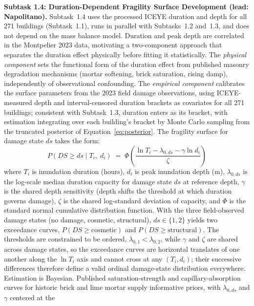\documentclass[11pt]{article}
\begin{document}
\textbf{Subtask 1.4: Duration-Dependent Fragility Surface Development
(lead: Napolitano).}
Subtask~1.4 uses the processed ICEYE duration and depth for all 271 buildings (Subtask~1.1), runs in parallel with Subtasks~1.2 and~1.3, and does not depend on the mass balance model.
Duration and peak depth are correlated in the Montpelier 2023 data, motivating a two-component approach that separates the duration effect physically before fitting it statistically.
The \textit{physical component} sets the functional form of the duration effect from
published masonry degradation mechanisms (mortar softening, brick saturation,
rising damp), independently of observational confounding.
The \textit{empirical component} calibrates the surface parameters from the 2023
field damage observations, using ICEYE-measured depth and interval-censored
duration brackets as covariates for all 271 buildings; consistent with
Subtask~1.3, duration enters as its bracket, with estimation integrating over
each building's bracket by Monte Carlo sampling from the truncated posterior
of Equation~\eqref{eq:posterior}.
The fragility surface for damage state $ds$ takes the form:
\begin{equation}\label{eq:fragility}
  P(DS \geq ds \mid T_i,\; d_i) \;=\; \Phi\!\left(
    \frac{\ln T_i - \lambda_{0,ds} - \gamma \ln d_i}{\zeta}\right)
\end{equation}
where $T_i$ is inundation duration (hours), $d_i$ is peak inundation depth (m),
$\lambda_{0,ds}$ is the log-scale median duration capacity for damage state $ds$
at reference depth, $\gamma$ is the shared depth sensitivity (depth shifts the
threshold at which duration governs damage), $\zeta$ is the shared log-standard
deviation of capacity, and $\Phi$ is the standard normal cumulative distribution
function. With the three field-observed damage states (no damage, cosmetic,
structural), $ds \in \{1,2\}$ yields two exceedance curves,
$P(DS \geq \text{cosmetic})$ and $P(DS \geq \text{structural})$. The thresholds
are constrained to be ordered, $\lambda_{0,1} < \lambda_{0,2}$, while
$\gamma$ and $\zeta$ are shared across damage states, so the exceedance curves are
horizontal translates of one another along the $\ln T_i$ axis and cannot cross at any $(T_i, d_i)$; their
successive differences therefore define a valid ordinal damage-state distribution
everywhere.
Estimation is Bayesian. Published saturation-strength and capillary-absorption
curves for historic brick and lime mortar
\cite{hall2009water,franzoni2015compressive,sathiparan2018effect} supply
informative priors, with $\lambda_{0,ds}$ and $\gamma$ centered at the
\end{document}
